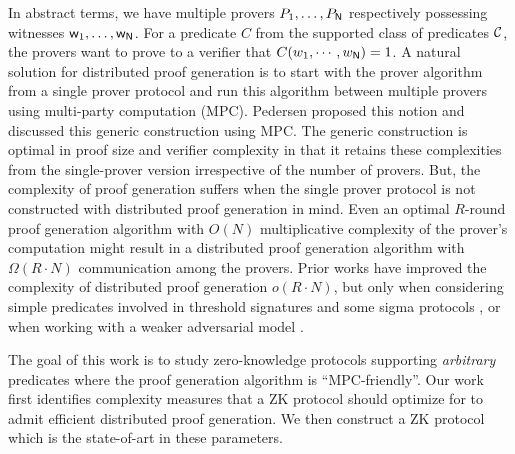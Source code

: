 In abstract terms, we have multiple provers $P_1, \ldots, P_{\mathsf{N}}$ respectively possessing witnesses $\mathsf{w}_1, \ldots, \mathsf{w}_{\mathsf{N}}$. For a predicate $C$ from the supported class of predicates ${\cal C}$, the provers want to prove to a verifier that $C(w_1,\cdots,w_{\mathsf{N}}) = 1$.
A natural solution for distributed proof generation is to start with the prover algorithm from a single prover protocol and run this algorithm between multiple provers using multi-party computation (MPC). Pedersen \cite{Ped92} proposed this notion and discussed this generic construction using MPC.
The generic construction is optimal in proof size and verifier complexity in that it retains these complexities from the single-prover version irrespective of the number of provers. But, the complexity of proof generation suffers when the single prover protocol is not constructed with distributed proof generation in mind. Even an optimal $R$-round proof generation algorithm with $O(N)$ multiplicative complexity of the prover's computation  might result in a distributed proof generation algorithm with $\Omega(R \cdot N)$ communication among the provers.
Prior works have improved the complexity of distributed proof generation $o(R \cdot N)$, but only when considering simple predicates involved in threshold signatures \cite{DDS} and some sigma protocols \cite{EfficientTZ}, or when working with a weaker adversarial model \cite{trinocchio}.

The goal of this work is to study zero-knowledge protocols supporting \textit{arbitrary} predicates where the proof generation algorithm is ``MPC-friendly''. %
Our work first identifies complexity measures that a ZK protocol should optimize for to admit efficient distributed proof generation. We then construct a ZK protocol which is the state-of-art in these parameters.

